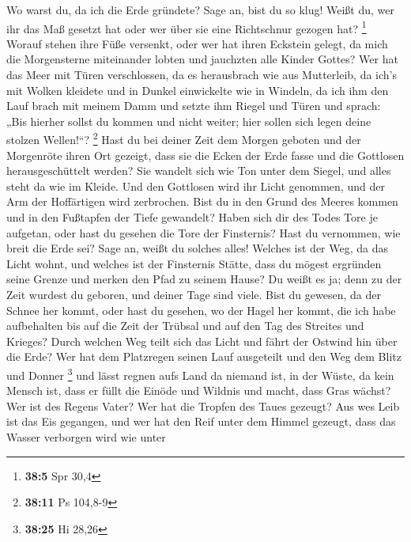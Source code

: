  Wo warst du, da ich die Erde gründete? Sage an, bist du
so klug!  Weißt du, wer ihr das Maß gesetzt hat oder wer
über sie eine Richtschnur gezogen hat? \footnote{\textbf{38:5} Spr 30,4}
 Worauf stehen ihre Füße versenkt, oder wer hat ihren
Eckstein gelegt,  da mich die Morgensterne miteinander
lobten und jauchzten alle Kinder Gottes?  Wer hat das Meer
mit Türen verschlossen, da es herausbrach wie aus Mutterleib,
 da ich's mit Wolken kleidete und in Dunkel einwickelte
wie in Windeln,  da ich ihm den Lauf brach mit meinem
Damm und setzte ihm Riegel und Türen  und sprach: „Bis
hierher sollst du kommen und nicht weiter; hier sollen sich legen deine
stolzen Wellen!{}``? \footnote{\textbf{38:11} Ps 104,8-9}
 Hast du bei deiner Zeit dem Morgen geboten und der
Morgenröte ihren Ort gezeigt,  dass sie die Ecken der
Erde fasse und die Gottlosen herausgeschüttelt werden? 
Sie wandelt sich wie Ton unter dem Siegel, und alles steht da wie im
Kleide.  Und den Gottlosen wird ihr Licht genommen, und
der Arm der Hoffärtigen wird zerbrochen.  Bist du in den
Grund des Meeres kommen und in den Fußtapfen der Tiefe gewandelt?
 Haben sich dir des Todes Tore je aufgetan, oder hast du
gesehen die Tore der Finsternis?  Hast du vernommen, wie
breit die Erde sei? Sage an, weißt du solches alles! 
Welches ist der Weg, da das Licht wohnt, und welches ist der Finsternis
Stätte,  dass du mögest ergründen seine Grenze und merken
den Pfad zu seinem Hause?  Du weißt es ja; denn zu der
Zeit wurdest du geboren, und deiner Tage sind viele. 
Bist du gewesen, da der Schnee her kommt, oder hast du gesehen, wo der
Hagel her kommt,  die ich habe aufbehalten bis auf die
Zeit der Trübsal und auf den Tag des Streites und Krieges?
 Durch welchen Weg teilt sich das Licht und fährt der
Ostwind hin über die Erde?  Wer hat dem Platzregen seinen
Lauf ausgeteilt und den Weg dem Blitz und Donner \footnote{\textbf{38:25}
  Hi 28,26}  und lässt regnen aufs Land da niemand ist,
in der Wüste, da kein Mensch ist,  dass er füllt die
Einöde und Wildnis und macht, dass Gras wächst?  Wer ist
des Regens Vater? Wer hat die Tropfen des Taues gezeugt? 
Aus wes Leib ist das Eis gegangen, und wer hat den Reif unter dem Himmel
gezeugt,  dass das Wasser verborgen wird wie unter
